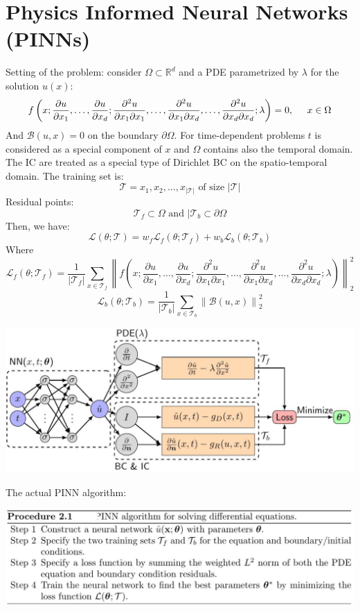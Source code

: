 \section{Physics Informed Neural Networks (PINNs)}
Setting of the problem: consider $\Omega \subset \mathbb{R}^d$ and a PDE parametrized by $\lambda$ for the solution $u(x)$:
\[
    f\left(x; \dfrac{\partial u}{\partial x_1}, \dots, \dfrac{\partial u}{\partial x_d}; \dfrac{\partial^2 u}{\partial x_1 \partial x_1}, \dots, \dfrac{\partial^2 u}{\partial x_1 \partial x_d}, \dots, \dfrac{\partial^2 u}{\partial x_d \partial x_d}; \lambda\right) = 0, \hspace{0.5cm} x \in \Omega    
\]
And $\mathcal{B}(u,x) = 0$ on the boundary $\partial \Omega$. For time-dependent problems $t$ is considered as a special component of $x$ and $\Omega$ contains also the temporal domain. The IC are treated as a special type of Dirichlet BC on the spatio-temporal domain. 
The training set is:
\[
    \mathcal{T} = {x_1, x_2, \dots, x_{|\mathcal{T}|}} \text{ of size } |\mathcal{T}|    
\]
Residual points:
\[
    \mathcal{T}_f \subset \Omega \text{ and } |\mathcal{T}_b \subset \partial \Omega     
\]
Then, we have:
\[
    \mathcal{L}(\theta; \mathcal{T}) = w_f\mathcal{L}_f(\theta; \mathcal{T}_f) + w_b\mathcal{L}_b(\theta; \mathcal{T}_b)     
\]
Where
\[
    \mathcal{L}_f(\theta; \mathcal{T}_f) = \dfrac{1}{|\mathcal{T}_f|} \sum_{x \in \mathcal{T}_f} \left\|f\left(x; \dfrac{\partial u}{\partial x_1}, \dots, \dfrac{\partial u}{\partial x_d}; \dfrac{\partial^2 u}{\partial x_1 \partial x_1}, \dots, \dfrac{\partial^2 u}{\partial x_1 \partial x_d}, \dots, \dfrac{\partial^2 u}{\partial x_d \partial x_d}; \lambda\right)\right\|^2_2 
\]
\[
    \mathcal{L}_b(\theta; \mathcal{T}_b) = \dfrac{1}{|\mathcal{T}_b|} \sum_{x \in \mathcal{T}_b} \left\|\mathcal{B}(u,x)\right\|^2_2
\]
\begin{center}
    \includegraphics[scale=0.3]{../images/PINN_Architecture.png}
\end{center}
The actual PINN algorithm:
\begin{center}
    \includegraphics[scale=0.3]{../images/PINN_Algorithm.png}
\end{center}


